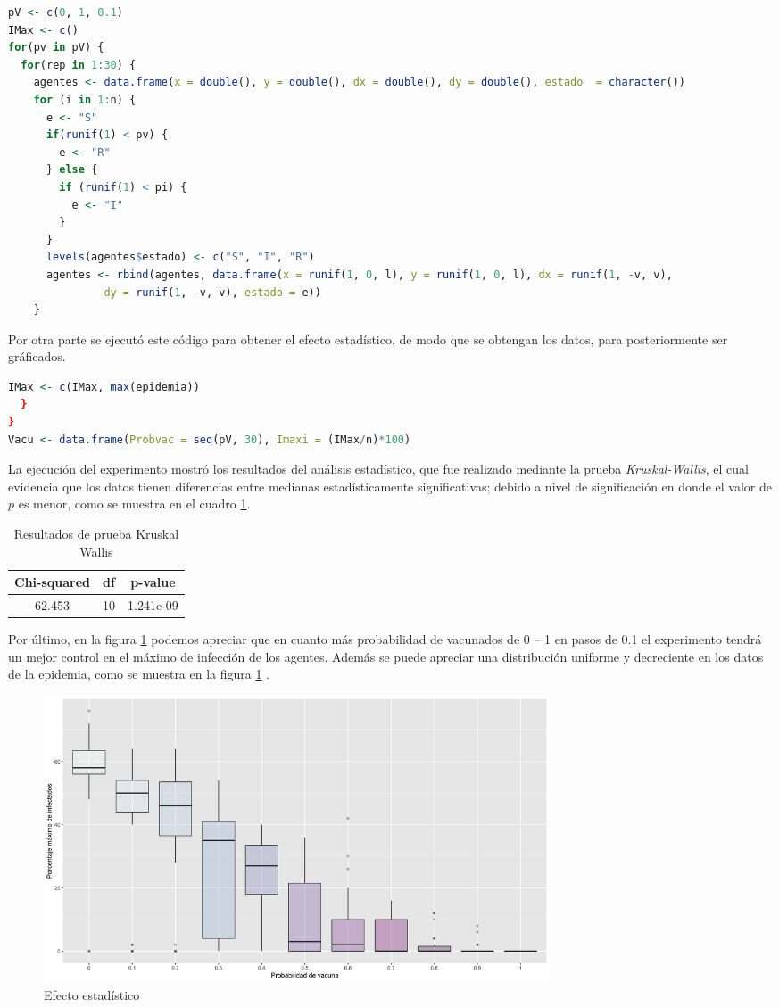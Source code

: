 \documentclass[12pt, letterpaper] {article}
\begin{document}
\begin{lstlisting}[language=R]
pV <- c(0, 1, 0.1)
IMax <- c()
for(pv in pV) { 
  for(rep in 1:30) {
    agentes <- data.frame(x = double(), y = double(), dx = double(), dy = double(), estado  = character())
    for (i in 1:n) {
      e <- "S"
      if(runif(1) < pv) {
        e <- "R"
      } else {
        if (runif(1) < pi) {
          e <- "I"
        }
      }
      levels(agentes$estado) <- c("S", "I", "R")
      agentes <- rbind(agentes, data.frame(x = runif(1, 0, l), y = runif(1, 0, l), dx = runif(1, -v, v), 
               dy = runif(1, -v, v), estado = e))
    }
\end{lstlisting}

Por otra parte se ejecutó este código para obtener el efecto estadístico, de modo que se obtengan los datos, para posteriormente ser gráficados.

\begin{lstlisting}[language=R]
IMax <- c(IMax, max(epidemia))
  }
}
Vacu <- data.frame(Probvac = seq(pV, 30), Imaxi = (IMax/n)*100)
\end{lstlisting}

La ejecución del experimento mostró los resultados del análisis estadístico, que fue realizado mediante la prueba \textit{Kruskal-Wallis}, el cual evidencia que los datos tienen diferencias entre medianas estadísticamente significativas; debido a nivel de significación en donde el valor de $p$  es menor, como se muestra en el cuadro \ref{PKWE}.


\begin{table}[H]
\caption{Resultados de prueba Kruskal Wallis}
\label{PKWE}
\centering\begin{tabular}{|c|c|c|}
\hline
\rowcolor[HTML]{DAE8FC} 
{\color[HTML]{333333} Chi-squared} & df & p-value   \\ \hline
\rowcolor[HTML]{EFEFEF} 
{\color[HTML]{333333} 62.453}                     & 10 & 1.241e-09 \\ \hline
\end{tabular}
\end{table}


Por último, en la figura \ref{Ees} podemos apreciar que en cuanto más probabilidad de vacunados de 0 -- 1 en pasos de 0.1 el experimento tendrá un mejor control en el máximo de infección de los agentes. Además se puede apreciar una distribución uniforme y decreciente en los datos de la epidemia, como se muestra en la figura \ref{Ees} . 

\begin{figure}[H]
\centering\includegraphics[width=150mm]{Avac.png}
\caption{Efecto estadístico}
\label{Ees}
\end{figure}





\end{document}
